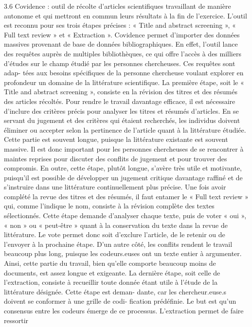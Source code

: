 \documentclass[
  letterpaper,
]{scrbook}
\begin{document}
3.6 Covidence : outil de récolte d'articles scientifiques travaillant de
manière autonome et qui mettront en commun leurs résultats à la fin de
l'exercice. L'outil est reconnu pour ses trois étapes précises : « Title
and abstract screening », « Full text review » et « Extraction ».
Covidence permet d'importer des données massives provenant de base de
données bibliographiques. En effet, l'outil lance des requêtes auprès de
multiples bibliothèques, ce qui offre l'accès à des milliers d'études
sur le champ étudié par les personnes chercheuses. Ces requêtes sont
adap- tées aux besoins spécifiques de la personne chercheuse voulant
explorer en profondeur un domaine de la littérature scientifique. La
première étape, soit le « Title and abstract screening », consiste en la
révision des titres et des résumés des articles récoltés. Pour rendre le
travail davantage eﬀicace, il est nécessaire d'inclure des critères
précis pour analyser les titres et résumés d'articles. En se servant du
jugement et des critères qui étaient recherchés, les individus doivent
éliminer ou accepter selon la pertinence de l'article quant à la
littérature étudiée. Cette partie est souvent longue, puisque la
littérature existante est souvent massive. Il est donc important pour
les personnes chercheuses de se rencontrer à maintes reprises pour
discuter des conflits de jugement et pour trouver des compromis. En
outre, cette étape, plutôt longue, s'avère très utile et motivante,
puisqu'il est possible de développer un jugement critique davantage
raﬀiné et de s'instruire dans une littérature continuellement plus
précise. Une fois avoir complété la revue des titres et des résumés, il
faut entamer le « Full text review » qui, comme l'indique le nom,
consiste à la révision complète des textes sélectionnés. Cette étape
demande d'analyser chaque texte, puis de voter « oui », « non » ou «
peut-être » quant à la conservation du texte dans la revue de
littérature. Le vote permet donc soit d'exclure l'article, de le retenir
ou de l'envoyer à la prochaine étape. D'un autre côté, les conflits
rendent le travail beaucoup plus long, puisque les codeurs.euses ont un
texte entier à argumenter. Ainsi, cette partie du travail, bien qu'elle
comporte beaucoup moins de documents, est assez longue et exigeante. La
dernière étape, soit celle de l'extraction, consiste à recueillir toute
donnée étant utile à l'étude de la littérature désignée. Cette étape est
deman- dante, car les chercheur.euse.s doivent se conformer à une grille
de codi- fication prédéfinie. Le but est qu'un consensus entre les
codeurs émerge de ce processus. L'extraction permet de faire ressortir
\end{document}
